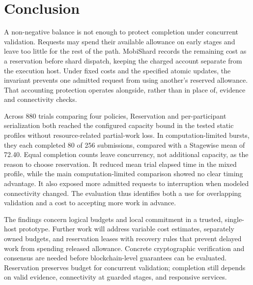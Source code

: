 \section{Conclusion}
\label{sec:conclusion}

A non-negative balance is not enough to protect completion under concurrent
validation. Requests may spend their available allowance on early stages and
leave too little for the rest of the path. MobiShard records the remaining
cost as a reservation before shard dispatch, keeping the charged account
separate from the execution host. Under fixed costs and the specified atomic
updates, the invariant prevents one admitted request from using another's
reserved allowance. That accounting protection operates alongside, rather
than in place of, evidence and connectivity checks.

Across 880 trials comparing four policies, Reservation and per-participant
serialization both reached the configured capacity bound in the tested static
profiles without resource-related partial-work loss. In computation-limited
bursts, they each completed 80 of 256 submissions, compared with a Stagewise
mean of 72.40. Equal completion counts leave concurrency, not additional
capacity, as the reason to choose reservation. It reduced mean trial elapsed
time in the mixed profile, while the main computation-limited comparison
showed no clear timing advantage. It also exposed more admitted requests
to interruption when modeled connectivity changed. The evaluation thus
identifies both a use for overlapping validation and a cost to accepting
more work in advance.

The findings concern logical budgets and local commitment in a trusted,
single-host prototype. Further work will address variable cost estimates,
separately owned budgets, and reservation leases with recovery rules that
prevent delayed work from spending released allowance. Concrete cryptographic
verification and consensus are needed before blockchain-level guarantees
can be evaluated. Reservation preserves budget for concurrent validation;
completion still depends on valid evidence, connectivity at guarded stages,
and responsive services.